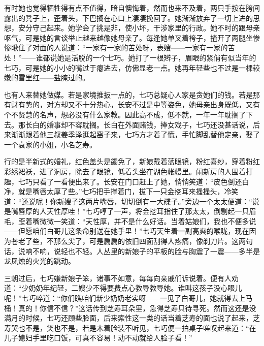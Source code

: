 \par 有时她也觉得牺牲得有点不值得，暗自懊悔着，然而也来不及着，两只手按在胯间露出的凳子上，歪着头，下巴搁在心口上凄凄挽回了。她渐渐放弃了一切上进的思想，安分守己起来。她学会了挑是非，使小坏，干涉家里的行政。她不时的跟母亲呕气，可是她的言谈举止越来越像她母亲了。每逢她单叉着袴子，揸开了两腿坐惨惨瞅住了对面的人说道：“一家有一家的苦处呀，表嫂——一家有一家的苦处！”——谁都说她是活脱的一个七巧。她打了一根辫子，眉眼的紧俏有似当年的七巧，可是她的小小的嘴过于瘪进去，仿佛显老一点。她再年轻些也不过是一棵较嫩的雪里红——盐腌过的。
\par 也有人来替她做媒。若是家境推扳一点的，七巧总疑心人家是贪她们的钱。若是那有财有势的，对方却又不十分热心，长安不过是中等姿色，她母亲出身既低，又有个不贤慧的名声，想必没有什么家教。因此高不成，低不就，一年一年耽搁了下去。那长白的婚事却不容耽搁。长白在外面赌钱，捧女戏子，七巧还没甚话说，后来渐渐跟着他三叔姜季泽逛起窑子来，七巧方才着了慌，手忙脚乱替他定亲，娶了一个袁家的小姐，小名芝寿。
\par 行的是半新式的婚礼，红色盖头是蠲免了，新娘戴着蓝眼镜，粉红喜纱，穿着粉红彩绣裙袄，进了洞房，除去了眼镜，低着头坐在湖色帐幔里。闹新房的人围着打趣，七巧只看了一看便出来了。长安在门口赶上了她，悄悄笑道：“皮色倒还白净，就是嘴唇太厚了些。”七巧把手撑着门，拔下一只金挖耳来搔搔头，冷笑道：“还说呢！你新嫂子这两片嘴唇，切切倒有一大碟子。”旁边一个太太便道：“说是嘴唇厚的人天性厚哇！”七巧哼了一声，将金挖耳指住了那太太，倒剔起一只眉毛，歪着嘴微微一笑道：“天性厚，并不是什么好话。当着姑娘们，我也不便多说——但愿咱们白哥儿这条命别送在她手里！”七巧天生着一副高爽的喉咙，现在因为苍老了些，不那么尖了，可是扃扃的依旧四面刮得人疼痛，像剃刀片。这两句话，说响不响，说轻也不轻。人丛里的新娘子的平板的脸与胸震了一震——多半是龙凤烛的火光的跳动。
\par 三朝过后，七巧嫌新娘子笨，诸事不如意，每每向亲戚们诉说着。便有人劝道：“少奶奶年纪轻，二嫂少不得要费点心教导教导她。谁叫这孩子没心眼儿呢！”七巧啐道：“你们瞧咱们新少奶奶老实呀——一见了白哥儿，她就得去上马桶！真的！你信不信？”这话传到芝寿耳朵里，急得芝寿只待寻死。然而这还是没满月的时候，七巧还顾些脸面，后来索性这一类的话当着芝寿的面也说了起来，芝寿哭也不是，笑也不是，若是木着脸装不听见，七巧便一拍桌子嗟叹起来道：“在儿子媳妇手里吃口饭，可真不容易！动不动就给人脸子看！”
